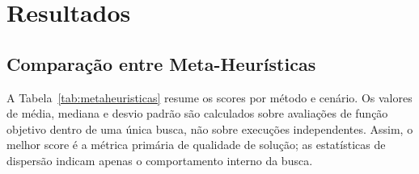 \documentclass[12pt,a4paper]{article}
\begin{document}
\section{Resultados}

\subsection{Comparação entre Meta-Heurísticas}

A Tabela~\ref{tab:metaheuristicas} resume os scores por método e cenário. Os valores de média, mediana e desvio padrão são calculados sobre avaliações de função objetivo dentro de uma única busca, não sobre execuções independentes. Assim, o melhor score é a métrica primária de qualidade de solução; as estatísticas de dispersão indicam apenas o comportamento interno da busca.
\end{document}
